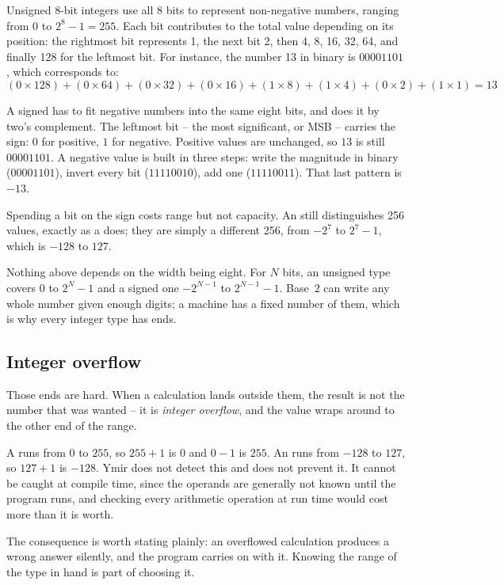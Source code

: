 Unsigned 8-bit integers  use all 8 bits to represent non-negative
numbers, ranging from $0$ to $2^8-1 = 255$. Each bit contributes to the total
value depending on its position: the rightmost bit represents 1, the next bit 2,
then 4, 8, 16, 32, 64, and finally 128 for the leftmost bit. For instance, the
number 13 in binary is $00001101$, which corresponds to:
\begin{equation}
  (0\times{}128) +
  (0\times{}64) + (0\times{}32) + (0\times{}16) + (1\times{}8) + (1\times{}4) + (0\times{}2) +
  (1\times{}1) = 13
\end{equation}

A signed  has to fit negative numbers into the same eight bits, and
does it by two's complement. The leftmost bit -- the most significant, or MSB --
carries the sign: $0$ for positive, $1$ for negative. Positive values are
unchanged, so $13$ is still $00001101$. A negative value is built in three steps:
write the magnitude in binary ($00001101$), invert every bit ($11110010$), add
one ($11110011$). That last pattern is $-13$.

Spending a bit on the sign costs range but not capacity. An  still
distinguishes 256 values, exactly as a  does; they are simply a
different 256, from $-2^7$ to $2^7-1$, which is $-128$ to $127$.


Nothing above depends on the width being eight. For $N$ bits, an unsigned type
covers $0$ to $2^N-1$ and a signed one $-2^{N-1}$ to $2^{N-1}-1$. Base~$2$ can
write any whole number given enough digits; a machine has a fixed number of them,
which is why every integer type has ends.


\subsection{Integer overflow}
\label{sec:types:integer_overflow}

Those ends are hard. When a calculation lands outside them, the result is not the
number that was wanted -- it is \textit{integer overflow}, and the value wraps
around to the other end of the range.

A  runs from $0$ to $255$, so $255 + 1$ is $0$ and $0 - 1$ is $255$. An
 runs from $-128$ to $127$, so $127 + 1$ is $-128$. Ymir does not
detect this and does not prevent it. It cannot be caught at compile time, since
the operands are generally not known until the program runs, and checking every
arithmetic operation at run time would cost more than it is worth.

The consequence is worth stating plainly: an overflowed calculation produces a
wrong answer silently, and the program carries on with it. Knowing the range of
the type in hand is part of choosing it.
